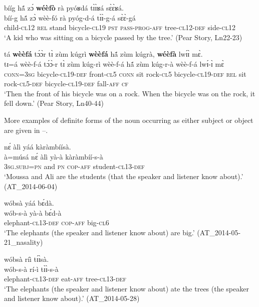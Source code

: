 \documentclass[output=paper]{langsci/langscibook}
\begin{document}
\ea\label{ex:teo:40}
\glll bííg h\'{ã} z\'ɔ \textbf{wéèfò} rà pyóʁdá t\`ɪ\`ɪʁá s\`ɛ\`ɛʁá.\\
 bíí-g h\'{ã} z\`ɔ wèè-fó rà pyóg-d-á t\`ɪ\`ɪ-g-á s\`ɛ\`ɛ-gá\\
child-\textsc{cl}12 \textsc{rel} stand bicycle-\textsc{cl}19 \textsc{pst} \textsc{pass-prog-aff} tree-\textsc{cl12-def} side-\textsc{cl12}\\
\glt ‘A kid who was sitting on a bicycle passed by the tree.’ (Pear Story, Ln22-23)
\z

\ea\label{ex:teo:41}
\glll tá \textbf{wèèfá} t\'ɔ\`ɔr t\`ɪ zùm kúgrì \textbf{wèèfá} h\'{ã} zùm kúgrà, \textbf{wéèfà} lw\'ɪ\`ɪ m\`ɛ. \\
 tɪ=á wèè-f-á t\'ɔ\`ɔ-r t\`ɪ zùm kúg-rì wèè-f-á h\'{ã} zùm kúg-r-à wèè-f-á lw\'ɪ-\`ɪ m\`ɛ\\
 \textsc{conn}=3\textsc{sg} bicycle-\textsc{cl19}-\textsc{def} front-\textsc{cl}5 \textsc{conn} sit rock-\textsc{cl}5 bicycle-\textsc{cl19}-\textsc{def} \textsc{rel} sit rock-\textsc{cl}5-\textsc{def} bicycle-\textsc{cl}19-\textsc{def} fall-\textsc{aff} \textsc{cf}\\
\glt ‘Then the front of his bicycle was on a rock. When the bicycle was on the rock, it fell down.’ (Pear Story, Ln40-44)
\z

More examples of definite forms of the noun occurring as either subject or object are given in –.

\ea\label{ex:teo:42}
 n\'ɛ àlì yáá kàràmbíísà.\\
 à=músá n\'ɛ àlì yà-à kàràmbíí-s-à \\
\textsc{3sg.subj=pn} and \textsc{pn} \textsc{cop-aff} student-\textsc{cl13-def} \\
\glt ‘Moussa and Ali are the students (that the speaker and listener know about).’ (AT\_2014-06-04)
\z

\ea\label{ex:teo:43}
\glll wóbsà yáá b\'ɛdà.\\
 wób-s-à yà-à b\'ɛd-à\\
elephant-\textsc{cl13-def} \textsc{cop-aff} big-\textsc{cl6}\\
\glt ‘The elephants (the speaker and listener know about) are big.’ (AT\_2014-05-21\_nasality)
\z

\ea\label{ex:teo:44}
\glll wóbsà ríì t\'ɪ\`ɪsà.\\
 wób-s-à rí-ì t\`ɪ\`ɪ-s-à\\
elephant-\textsc{cl13-def} eat-\textsc{aff} tree-\textsc{cl13-def}\\
\glt ‘The elephants (the speaker and listener know about) ate the trees (the speaker and listener know about).’ (AT\_2014-05-28)
\z
\end{document}
